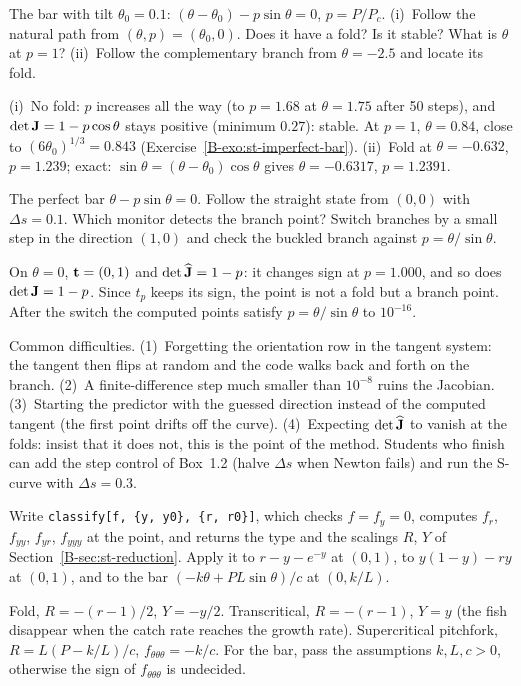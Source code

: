 \qc The bar with tilt $\theta_0 = 0.1$: $(\theta - \theta_0) - p\sin\theta = 0$,
$p = P/P_c$. (i)~Follow the natural path from $(\theta,p) = (\theta_0, 0)$. Does it have
a fold? Is it stable? What is $\theta$ at $p = 1$? (ii)~Follow the complementary branch
from $\theta = -2.5$ and locate its fold.
\begin{answer}
(i)~No fold: $p$ increases all the way (to $p = 1.68$ at $\theta = 1.75$ after 50 steps),
and $\det\mathbf{J} = 1 - p\cos\theta$ stays positive (minimum $0.27$): stable. At $p = 1$,
$\theta = 0.84$, close to $(6\theta_0)^{1/3} = 0.843$
(Exercise~\ref{B-exo:st-imperfect-bar}). (ii)~Fold at $\theta = -0.632$, $p = 1.239$;
exact: $\sin\theta = (\theta - \theta_0)\cos\theta$ gives $\theta = -0.6317$,
$p = 1.2391$.
\end{answer}

\qc The perfect bar $\theta - p\sin\theta = 0$. Follow the straight state from $(0,0)$
with $\Delta s = 0.1$. Which monitor detects the branch point? Switch branches by a
small step in the direction $(1,0)$ and check the buckled branch against
$p = \theta/\sin\theta$.
\begin{answer}
On $\theta = 0$, $\mathbf{t} = (0,1)$ and $\det\widehat{\mathbf{J}} = 1 - p$: it changes sign at
$p = 1.000$, and so does $\det\mathbf{J} = 1 - p$. Since $t_p$ keeps its sign, the point is
not a fold but a branch point. After the switch the computed points satisfy
$p = \theta/\sin\theta$ to $10^{-16}$.
\end{answer}

\begin{instructor}
Common difficulties. (1)~Forgetting the orientation row in the tangent system: the
tangent then flips at random and the code walks back and forth on the branch.
(2)~A finite-difference step much smaller than $10^{-8}$ ruins the Jacobian.
(3)~Starting the predictor with the guessed direction instead of the computed tangent
(the first point drifts off the curve). (4)~Expecting $\det\widehat{\mathbf{J}}$ to vanish at
the folds: insist that it does not, this is the point of the method. Students who
finish can add the step control of Box~1.2 (halve $\Delta s$ when Newton fails) and
run the S-curve with $\Delta s = 0.3$.
\end{instructor}

\qc Write \texttt{classify[f, \{y, y0\}, \{r, r0\}]}, which checks $f = f_y = 0$,
computes $f_r$, $f_{yy}$, $f_{yr}$, $f_{yyy}$ at the point, and returns the type and the
scalings $R$, $Y$ of Section~\ref{B-sec:st-reduction}. Apply it to $r - y - e^{-y}$ at
$(0,1)$, to $y(1-y) - ry$ at $(0,1)$, and to the bar
$(-k\theta + PL\sin\theta)/c$ at $(0, k/L)$.
\begin{answer}
Fold, $R = -(r-1)/2$, $Y = -y/2$. Transcritical, $R = -(r-1)$, $Y = y$ (the fish
disappear when the catch rate reaches the growth rate). Supercritical pitchfork,
$R = L(P - k/L)/c$, $f_{\theta\theta\theta} = -k/c$. For the bar, pass the assumptions
$k, L, c > 0$, otherwise the sign of $f_{\theta\theta\theta}$ is undecided.
\end{answer}

